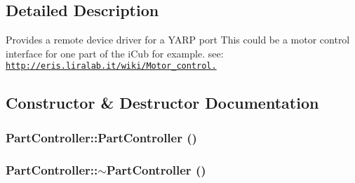 \subsection{Detailed Description}
Provides a remote device driver for a YARP port This could be a motor control interface for one part of the iCub for example. see: \href{http://eris.liralab.it/wiki/Motor_control.}{\tt http://eris.liralab.it/wiki/Motor\_\-control.} 

\subsection{Constructor \& Destructor Documentation}
\hypertarget{class_robot_model_1_1_part_controller_a9e5274fba78804eb936fc84048f21e73}{
\subsubsection[{PartController}]{\setlength{\rightskip}{0pt plus 5cm}PartController::PartController ()}}
\label{class_robot_model_1_1_part_controller_a9e5274fba78804eb936fc84048f21e73}
\hypertarget{class_robot_model_1_1_part_controller_aee568c7268577894104e0739a99c33f5}{
\subsubsection[{$\sim$PartController}]{\setlength{\rightskip}{0pt plus 5cm}PartController::$\sim$PartController ()}}
\label{class_robot_model_1_1_part_controller_aee568c7268577894104e0739a99c33f5}


